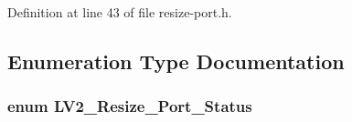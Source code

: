 Definition at line 43 of file resize-\/port.\+h.



\subsection{Enumeration Type Documentation}
\subsubsection[{\texorpdfstring{L\+V2\+\_\+\+Resize\+\_\+\+Port\+\_\+\+Status}{LV2_Resize_Port_Status}}]{\setlength{\rightskip}{0pt plus 5cm}enum {\bf L\+V2\+\_\+\+Resize\+\_\+\+Port\+\_\+\+Status}}\hypertarget{resize-port_8h_a71a46a5f08e889faa1b5b737bd2bcc16}{}\label{resize-port_8h_a71a46a5f08e889faa1b5b737bd2bcc16}

